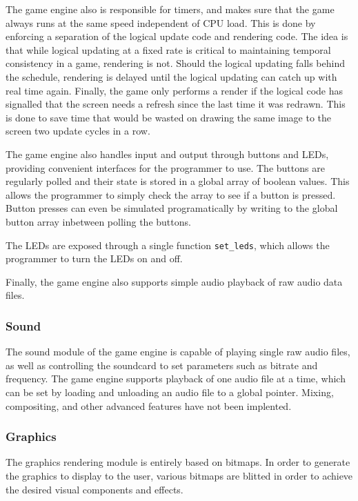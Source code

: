     The game engine also is responsible for timers, and makes sure that the game always runs at the same speed independent of CPU load.
    This is done by enforcing a separation of the logical update code and rendering code.
    The idea is that while logical updating at a fixed rate is critical to maintaining temporal consistency in a game, rendering is not.
    Should the logical updating falls behind the schedule, rendering is delayed until the logical updating can catch up with real time again.
    Finally, the game only performs a render if the logical code has signalled that the screen needs a refresh since the last time it was redrawn.
    This is done to save time that would be wasted on drawing the same image to the screen two update cycles in a row.

    The game engine also handles input and output through buttons and LEDs, providing convenient interfaces for the programmer to use.
    The buttons are regularly polled and their state is stored in a global array of boolean values.
    This allows the programmer to simply check the array to see if a button is pressed.
    Button presses can even be simulated programatically by writing to the global button array inbetween polling the buttons.

    The LEDs are exposed through a single function \texttt{set_leds}, which allows the programmer to turn the LEDs on and off.


    Finally, the game engine also supports simple audio playback of raw audio data files.

\subsubsection{Sound}
The sound module of the game engine is capable of playing single raw audio files, as well as controlling the soundcard to set parameters such as bitrate and frequency.
The game engine supports playback of one audio file at a time, which can be set by loading and unloading an audio file to a global pointer.
Mixing, compositing, and other advanced features have not been implented.

\subsubsection{Graphics}
The graphics rendering module is entirely based on bitmaps.
In order to generate the graphics to display to the user, various bitmaps are blitted in order to achieve the desired visual components and effects.


